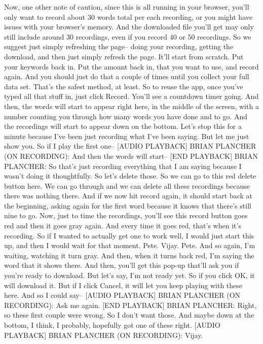 Now, one other note of caution, since this is all running in your browser,
you'll only want to record about 30 words total per each recording,
or you might have issues with your browser's memory.
And the downloaded file you'll get may only
still include around 30 recordings, even if you record 40 or 50 recordings.
So we suggest just simply refreshing the page--
doing your recording, getting the download,
and then just simply refresh the page.
It'll start from scratch.
Put your keywords back in.
Put the amount back in, that you want to use, and record again.
And you should just do that a couple of times until you collect your full data
set.
That's the safest method, at least.
So to reuse the app, once you've typed all that stuff in, just click Record.
You'll see a countdown timer going.
And then, the words will start to appear right here,
in the middle of the screen, with a number counting you
through how many words you have done and to go.
And the recordings will start to appear down on the bottom.
Let's stop this for a minute because I've been just recording
what I've been saying.
But let me just show you.
So if I play the first one--
[AUDIO PLAYBACK]
BRIAN PLANCHER (ON RECORDING): And then the words will start--
[END PLAYBACK]
BRIAN PLANCHER: So that's just recording everything
that I am saying because I wasn't doing it thoughtfully.
So let's delete those.
So we can go to this red delete button here.
We can go through and we can delete all these recordings
because there was nothing there.
And if we now hit record again, it should start back at the beginning,
asking again for the first word because it knows that there's still nine to go.
Now, just to time the recordings, you'll see this record button goes red
and then it goes gray again.
And every time it goes red, that's when it's recording.
So if I wanted to actually get one to work well, I would just start this up,
and then I would wait for that moment.
Pete.
Vijay.
Pete.
And so again, I'm waiting, watching it turn gray.
And then, when it turns back red, I'm saying the word that it shows there.
And then, you'll get this pop-up that'll ask you if you're ready to download.
But let's say, I'm not ready yet.
So if you click OK, it will download it.
But if I click Cancel, it will let you keep playing with these here.
And so I could say--
[AUDIO PLAYBACK]
BRIAN PLANCHER (ON RECORDING): Ask me again.
[END PLAYBACK]
BRIAN PLANCHER: Right, so these first couple were wrong.
So I don't want those.
And maybe down at the bottom, I think, I probably,
hopefully got one of these right.
[AUDIO PLAYBACK]
BRIAN PLANCHER (ON RECORDING): Vijay.
